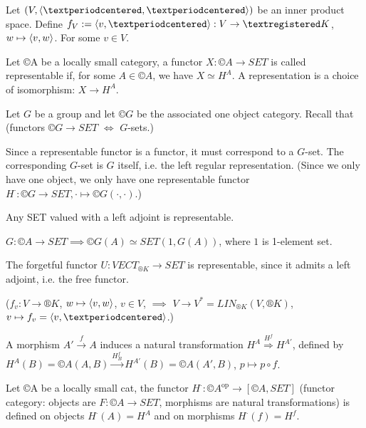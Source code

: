 \documentclass[12pt]{article}					%
\newcommand{\op}{^{\text{op}}}
\begin{document}
\begin{poznamka}
	Let $(V, \<·, ·\>)$ be an inner product space. Define $f_V := \<v, ·\>: V \rightarrow ®K$, $w \mapsto \left\langle v, w\right\rangle$. For some $v \in V$.
\end{poznamka}

\begin{definice}
	Let ©A be a locally small category, a functor $X: ©A \rightarrow SET$ is called representable if, for some $A \in ©A$, we have $X \simeq H^A$. A representation is a choice of isomorphism: $X \rightarrow H^A$.
\end{definice}

\begin{priklady}
	Let $G$ be a group and let $©G$ be the associated one object category. Recall that (functors $©G \rightarrow SET$ $\Leftrightarrow$ $G$-sets.)

	Since a representable functor is a functor, it must correspond to a $G$-set. The corresponding $G$-set is $G$ itself, i.e. the left regular representation. (Since we only have one object, we only have one representable functor $H^·: ©G \rightarrow SET, · \mapsto ©G(·, ·)$.)
\end{priklady}

\begin{tvrzeni}
	Any SET valued with a left adjoint is representable.

	\begin{dukazin}
		$G: ©A \rightarrow SET \implies ©G(A) \simeq SET(1, G(A))$, where $1$ is 1-element set.
	\end{dukazin}
\end{tvrzeni}

\begin{priklad}
	The forgetful functor $U: VECT_{®K} \rightarrow SET$ is representable, since it admits a left adjoint, i.e. the free functor.

	($f_v: V \rightarrow ®K$, $w \mapsto \left\langle v, w\right\rangle$, $v \in V$, $\implies$ $V \rightarrow V^* = LIN_{®K}(V, ®K)$, $v \mapsto f_v = \<v, ·\>$.)
\end{priklad}

\begin{poznamka}
	A morphism $A' \overset{f}\rightarrow A$ induces a natural transformation $H^A \overset{H^f}\Rightarrow H^{A'}$, defined by $H^A(B) = ©A(A, B) \overset{H_B^f}\rightarrow H^{A'}(B) = ©A(A', B)$, $p \mapsto p∘f$.
\end{poznamka}

\begin{definice}
	Let ©A be a locally small cat, the functor $H^·: ©A\op \rightarrow [©A, SET]$ (functor category: objects are $F: ©A \rightarrow SET$, morphisms are natural transformations) is defined on objects $H^·(A) = H^A$ and on morphisms $H^·(f) = H^f$.
\end{definice}
\end{document}

